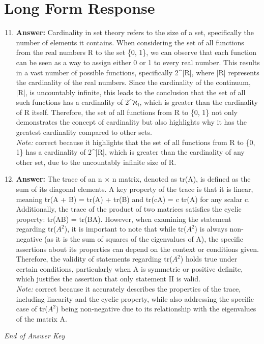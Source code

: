 \documentclass[12pt]{article}
\begin{document}
\section*{Long Form Response}
\begin{enumerate}[label=\arabic*.]
\setcounter{enumi}{10}
\item \textbf{Answer:} Cardinality in set theory refers to the size of a set, specifically the number of elements it contains. When considering the set of all functions from the real numbers R to the set \{0, 1\}, we can observe that each function can be seen as a way to assign either 0 or 1 to every real number. This results in a vast number of possible functions, specifically 2^|R|, where |R| represents the cardinality of the real numbers. Since the cardinality of the continuum, |R|, is uncountably infinite, this leads to the conclusion that the set of all such functions has a cardinality of 2^ℵ₁, which is greater than the cardinality of R itself. Therefore, the set of all functions from R to \{0, 1\} not only demonstrates the concept of cardinality but also highlights why it has the greatest cardinality compared to other sets.
\\ \textit{Note:} correct because it highlights that the set of all functions from R to \{0, 1\} has a cardinality of 2^|R|, which is greater than the cardinality of any other set, due to the uncountably infinite size of R.
\item \textbf{Answer:} The trace of an n \ensuremath{\times} n matrix, denoted as tr(A), is defined as the sum of its diagonal elements. A key property of the trace is that it is linear, meaning tr(A + B) = tr(A) + tr(B) and tr(cA) = c tr(A) for any scalar c. Additionally, the trace of the product of two matrices satisfies the cyclic property: tr(AB) = tr(BA). However, when examining the statement regarding tr($A^2$), it is important to note that while tr($A^2$) is always non- negative (as it is the sum of squares of the eigenvalues of A), the specific assertions about its properties can depend on the context or conditions given. Therefore, the validity of statements regarding tr($A^2$) holds true under certain conditions, particularly when A is symmetric or positive definite, which justifies the assertion that only statement II is valid.
\\ \textit{Note:} correct because it accurately describes the properties of the trace, including linearity and the cyclic property, while also addressing the specific case of tr($A^2$) being non-negative due to its relationship with the eigenvalues of the matrix A.
\end{enumerate}

\vfill
\noindent\textit{End of Answer Key}
\end{document}
